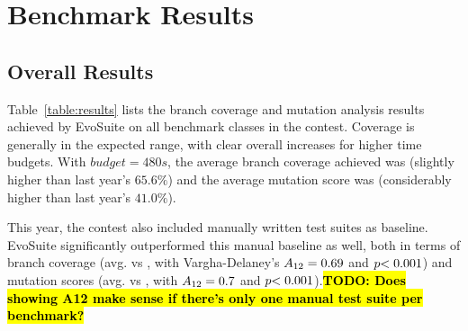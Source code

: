 \documentclass[10pt,conference]{IEEEtran}
\newcommand{\EVOSUITE}{{\sc EvoSuite}\xspace}
\newcommand{\TODO}[1]{\sethlcolor{yellow}\textbf{\textcolor{ScarletRed}{\hl{TODO: #1}}}\xspace}
\begin{document}
\section{Benchmark Results}

\begin{table*}[t]
  \centering
  \caption{\label{table:results}Detailed results of \EVOSUITE on the SBST benchmark classes.}
\resizebox{\textwidth}{!}{  

}	
\end{table*}

% 

% 

\subsection{Overall Results}

Table~\ref{table:results} lists the branch coverage and mutation
analysis results achieved by \EVOSUITE on all benchmark classes in the
contest. Coverage is generally in the expected range, with clear
overall increases for higher time budgets. With $budget=480s$, the
average branch coverage achieved was \AvgCovG (slightly higher than
last year's $65.6\%$) and the average mutation score was \AvgMutG
(considerably higher than last year's $41.0\%$).

This year, the contest also included manually written test suites as
baseline. \EVOSUITE significantly outperformed this manual baseline as
well, both in terms of branch coverage (avg. \AvgCovEvosuite vs
\AvgCovManual, with Vargha-Delaney's $A_{12}={0.69}$ and
$p{<0.001}$) and mutation scores (avg. \AvgMutEvosuite vs
\AvgMutManual, with $A_{12}={0.7}$ and
$p{<0.001}$).\TODO{Does showing A12 make sense if there's only one
  manual test suite per benchmark?}

\end{document}
